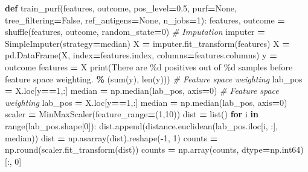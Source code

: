 \documentclass[
  11pt,
  oneside]{book}
\newenvironment{Shaded}{\begin{snugshade}}{\end{snugshade}}
\newcommand{\BuiltInTok}[1]{#1}
\newcommand{\CommentTok}[1]{\textcolor[rgb]{0.56,0.35,0.01}{\textit{#1}}}
\newcommand{\ControlFlowTok}[1]{\textcolor[rgb]{0.13,0.29,0.53}{\textbf{#1}}}
\newcommand{\DecValTok}[1]{\textcolor[rgb]{0.00,0.00,0.81}{#1}}
\newcommand{\FloatTok}[1]{\textcolor[rgb]{0.00,0.00,0.81}{#1}}
\newcommand{\KeywordTok}[1]{\textcolor[rgb]{0.13,0.29,0.53}{\textbf{#1}}}
\newcommand{\NormalTok}[1]{#1}
\newcommand{\OperatorTok}[1]{\textcolor[rgb]{0.81,0.36,0.00}{\textbf{#1}}}
\newcommand{\SpecialCharTok}[1]{\textcolor[rgb]{0.00,0.00,0.00}{#1}}
\newcommand{\StringTok}[1]{\textcolor[rgb]{0.31,0.60,0.02}{#1}}
\newcommand{\VariableTok}[1]{\textcolor[rgb]{0.00,0.00,0.00}{#1}}
\begin{document}
\begin{Shaded}
\begin{Highlighting}[]
\KeywordTok{def}\NormalTok{ train\_purf(features, outcome, pos\_level}\OperatorTok{=}\FloatTok{0.5}\NormalTok{, purf}\OperatorTok{=}\VariableTok{None}\NormalTok{, tree\_filtering}\OperatorTok{=}\VariableTok{False}\NormalTok{, ref\_antigens}\OperatorTok{=}\VariableTok{None}\NormalTok{, n\_jobs}\OperatorTok{=}\DecValTok{1}\NormalTok{):}
\NormalTok{    features, outcome }\OperatorTok{=}\NormalTok{ shuffle(features, outcome, random\_state}\OperatorTok{=}\DecValTok{0}\NormalTok{)}
    \CommentTok{\# Imputation}
\NormalTok{    imputer }\OperatorTok{=}\NormalTok{ SimpleImputer(strategy}\OperatorTok{=}\StringTok{\textquotesingle{}median\textquotesingle{}}\NormalTok{)}
\NormalTok{    X }\OperatorTok{=}\NormalTok{ imputer.fit\_transform(features)}
\NormalTok{    X }\OperatorTok{=}\NormalTok{ pd.DataFrame(X, index}\OperatorTok{=}\NormalTok{features.index, columns}\OperatorTok{=}\NormalTok{features.columns)}
\NormalTok{    y }\OperatorTok{=}\NormalTok{ outcome}
\NormalTok{    features }\OperatorTok{=}\NormalTok{ X}
    \BuiltInTok{print}\NormalTok{(}\StringTok{\textquotesingle{}There are }\SpecialCharTok{\%d}\StringTok{ positives out of }\SpecialCharTok{\%d}\StringTok{ samples before feature space weighting.\textquotesingle{}} \OperatorTok{\%}\NormalTok{ (}\BuiltInTok{sum}\NormalTok{(y), }\BuiltInTok{len}\NormalTok{(y)))}
    \CommentTok{\# Feature space weighting}
\NormalTok{    lab\_pos }\OperatorTok{=}\NormalTok{ X.loc[y}\OperatorTok{==}\DecValTok{1}\NormalTok{,:]}
\NormalTok{    median }\OperatorTok{=}\NormalTok{ np.median(lab\_pos, axis}\OperatorTok{=}\DecValTok{0}\NormalTok{)}
    \CommentTok{\# Feature space weighting}
\NormalTok{    lab\_pos }\OperatorTok{=}\NormalTok{ X.loc[y}\OperatorTok{==}\DecValTok{1}\NormalTok{,:]}
\NormalTok{    median }\OperatorTok{=}\NormalTok{ np.median(lab\_pos, axis}\OperatorTok{=}\DecValTok{0}\NormalTok{)}
\NormalTok{    scaler }\OperatorTok{=}\NormalTok{ MinMaxScaler(feature\_range}\OperatorTok{=}\NormalTok{(}\DecValTok{1}\NormalTok{,}\DecValTok{10}\NormalTok{))}
\NormalTok{    dist }\OperatorTok{=} \BuiltInTok{list}\NormalTok{()}
    \ControlFlowTok{for}\NormalTok{ i }\KeywordTok{in} \BuiltInTok{range}\NormalTok{(lab\_pos.shape[}\DecValTok{0}\NormalTok{]):}
\NormalTok{        dist.append(distance.euclidean(lab\_pos.iloc[i, :], median))}
\NormalTok{    dist }\OperatorTok{=}\NormalTok{ np.asarray(dist).reshape(}\OperatorTok{{-}}\DecValTok{1}\NormalTok{, }\DecValTok{1}\NormalTok{)}
\NormalTok{    counts }\OperatorTok{=}\NormalTok{ np.}\BuiltInTok{round}\NormalTok{(scaler.fit\_transform(dist))}
\NormalTok{    counts }\OperatorTok{=}\NormalTok{ np.array(counts, dtype}\OperatorTok{=}\NormalTok{np.int64)[:, }\DecValTok{0}\NormalTok{]}

\end{Highlighting}
\end{Shaded}
\end{document}
